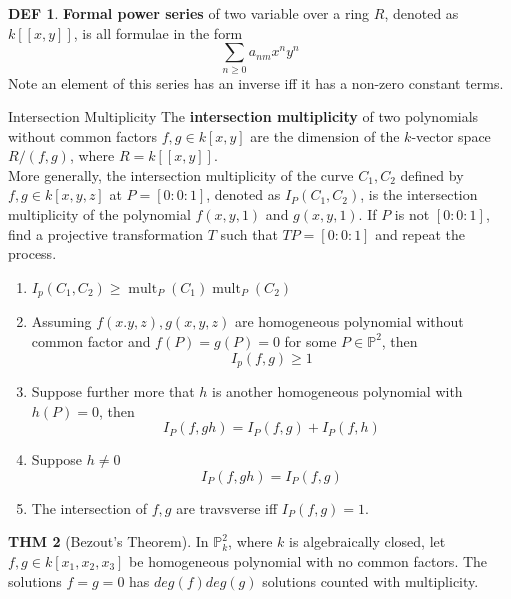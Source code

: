 \documentclass[twocolumn]{article}
\renewcommand{\emph}[1]{{\color{blue!70!black}\sffamily\bfseries #1}}
\DeclareMathOperator{\mult}{mult}
\renewcommand{\P}{\mathbb{P}}
\theoremstyle{definition}
\newtheorem{thm}{THM}
\newtheorem{defi}[thm]{DEF}
\theoremstyle{remark}
\begin{document}
\begin{defi}
	\emph{Formal power series} of two variable over a ring $R$, denoted as $k[[x, y]]$, is all formulae in the form 
	$$
	\sum_{n\geq 0} a_{nm}x^n y^n
	$$
	Note an element of this series has an inverse iff it has a non-zero constant terms.
\end{defi}

\begin{fthm}{Intersection Multiplicity}{}
	The \emph{intersection multiplicity} of two polynomials without common factors $f,g \in k[x, y]$ are the dimension of the $k$-vector space $R / (f, g)$, where $R = k[[x, y]]$.\\

	More generally, the intersection multiplicity of the curve $C_1, C_2$ defined by $f, g \in k[x, y, z]$ at $P = [0:0:1]$, denoted as $I_P(C_1, C_2)$, is the intersection multiplicity of the polynomial $f(x, y, 1)$ and $g(x, y, 1)$. 
	If $P$ is not $[0:0:1]$, find a projective transformation $T$ such that $TP = [0:0:1]$ and repeat the process.
	\tcblower
	\begin{enumerate}
		\item $I_p(C_1, C_2) \geq \mult_P(C_1)\mult_P(C_2)$
		\item Assuming $f(x. y, z), g(x, y, z)$ are homogeneous polynomial without common factor and $f(P) = g(P) = 0$ for some $P \in \P^2$, then $$I_p(f,g) \geq 1$$
		\item Suppose further more that $h$ is another homogeneous polynomial with $h(P) = 0$, then 
			$$
			I_P(f, gh) = I_P(f, g) + I_P(f, h)
			$$
		\item Suppose $h \neq 0$
			$$
			I_P(f, gh) = I_P(f, g) 
			$$
		\item The intersection of $f, g$ are travsverse iff $I_P(f, g) = 1$.
	\end{enumerate}
\end{fthm}

\begin{thm}[Bezout's Theorem]
	In $\P^2_k$, where $k$ is algebraically closed, let $f, g \in k[x_1, x_2, x_3]$ be homogeneous polynomial with no common factors.
	The solutions $f=g=0$ has $deg(f)deg(g)$ solutions counted with multiplicity.
\end{thm}
\end{document}
